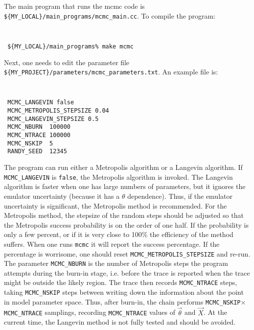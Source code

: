 \documentclass[UserManual.tex]{subfiles}
\begin{document}
The main program that runs the mcmc code is {\tt\$\{MY\_LOCAL\}/main\_programs/mcmc\_main.cc}. To compile the program:
{\tt
\begin{verbatim}
 ${MY_LOCAL}/main_programs% make mcmc
\end{verbatim}}
Next, one needs to edit the parameter file {\tt\$\{MY\_PROJECT\}/parameters/mcmc\_parameters.txt}. An example file is:
{\tt
\begin{verbatim}
 MCMC_LANGEVIN false
 MCMC_METROPOLIS_STEPSIZE 0.04
 MCMC_LANGEVIN_STEPSIZE 0.5
 MCMC_NBURN  100000
 MCMC_NTRACE 100000
 MCMC_NSKIP  5
 RANDY_SEED  12345
\end{verbatim}}
The program can run either a Metropolis algorithm or a Langevin algorithm. If {\tt MCMC\_LANGEVIN} is {\tt false}, the Metropolis algorithm is invoked. The Langevin algorithm is faster when one has large numbers of parameters, but it ignores the emulator uncertainty (because it has a $\theta$ dependence). Thus, if the emulator uncertainty is significant, the Metropolis method is recommended. For the Metropolis method, the stepsize of the random steps should be adjusted so that the Metropolis success probability is on the order of one half. If the probability is only a few percent, or if it is very close to 100\% the efficiency of the method suffers. When one runs {\tt mcmc} it will report the success percentage. If the percentage is worrisome, one should reset {\tt MCMC\_METROPOLIS\_STEPSIZE} and re-run. The parameter {\tt MCMC\_NBURN} is the number of Metropolis steps the program attempts during the burn-in stage, i.e. before the trace is reported when the trace might be outside the likely region. The trace then records {\tt MCMC\_NTRACE} steps, taking {\tt MCMC\_NSKIP} steps between writing down the information about the point in model parameter space. Thus, after burn-in, the chain performs {\tt MCMC\_NSKIP}$\times${\tt MCMC\_NTRACE} samplings, recording {\tt MCMC\_NTRACE} values of $\vec{\theta}$ and $\vec{X}$. At the current time, the Langevin method is not fully tested and should be avoided.
\end{document}
